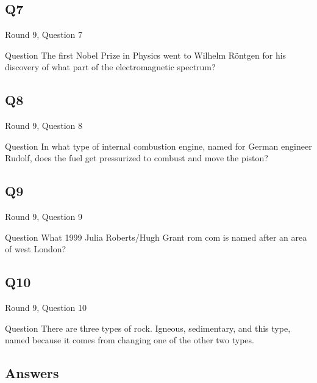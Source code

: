 \documentclass[11pt]{beamer}
\begin{document}
\subsection*{Q7}
\begin{frame}[t]{Round 9, Question 7}
\vspace{2em}
\begin{block}{Question}
The first Nobel Prize in Physics went to Wilhelm Röntgen for his discovery of what part of the electromagnetic spectrum\@?
\end{block}
\end{frame}
    

\subsection*{Q8}
\begin{frame}[t]{Round 9, Question 8}
\vspace{2em}
\begin{block}{Question}
In what type of internal combustion engine, named for German engineer Rudolf, does the fuel get pressurized to combust and move the piston\@?
\end{block}
\end{frame}
    

\subsection*{Q9}
\begin{frame}[t]{Round 9, Question 9}
\vspace{2em}
\begin{block}{Question}
What 1999 Julia Roberts/Hugh Grant rom com is named after an area of west London\@?
\end{block}
\end{frame}
    

\subsection*{Q10}
\begin{frame}[t]{Round 9, Question 10}
\vspace{2em}
\begin{block}{Question}
There are three types of rock. Igneous, sedimentary, and this type, named because it comes from changing one of the other two types.
\end{block}
\end{frame}
    
\subsection{Answers}
\end{document}
